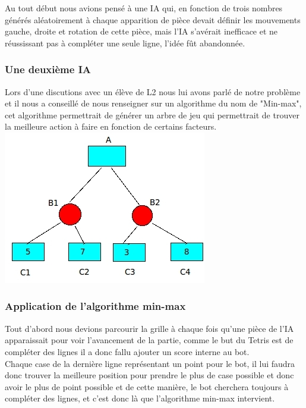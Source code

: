 \documentclass[a4paper, 11pt]{article}
\begin{document}
                Au tout début nous avions pensé à une IA qui, en fonction de trois nombres générés aléatoirement à chaque apparition de pièce devait définir les mouvements gauche, droite et rotation de cette pièce, mais l'IA s'avérait inefficace et ne réussissant pas à compléter une seule ligne, l'idée fût abandonnée.

            \subsubsection{Une deuxième IA}
                Lors d'une discutions avec un élève de L2 nous lui avons parlé de notre problème et il nous a conseillé de nous renseigner sur un algorithme du nom de "Min-max", cet algorithme permettrait de générer
                un arbre de jeu qui permettrait de trouver la meilleure action à faire en fonction de certains facteurs. \newline 
                \includegraphics[scale=0.6]{images/minmax.jpg}

            \subsubsection{Application de l'algorithme min-max}

                Tout d'abord nous devions parcourir la grille à chaque fois qu'une pièce de l'IA apparaissait  pour voir l'avancement de la partie, comme le but du Tetris est de compléter des lignes il a donc fallu ajouter un score interne au bot.\newline\\ Chaque case de la dernière ligne représentant un point pour le bot, il lui faudra donc trouver la meilleure position pour prendre le plus de case possible et donc avoir le plus de point possible et de cette manière, le bot cherchera toujours à compléter des lignes, et c'est donc là que l'algorithme min-max intervient.
                
\end{document}
